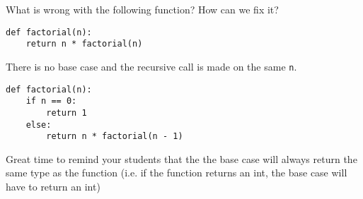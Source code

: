 \begin{blocksection}
\question What is wrong with the following function? How can we fix it?

\begin{lstlisting}
def factorial(n):
    return n * factorial(n)
\end{lstlisting}

\begin{solution}[1in]
There is no base case and the recursive call is made on the same \lstinline{n}.

\begin{lstlisting}
def factorial(n):
    if n == 0:
        return 1
    else:
        return n * factorial(n - 1)
\end{lstlisting}
\end{solution}

\begin{questionmeta}
    Great time to remind your students that the the base case will always return
     the same type as the function (i.e. if the function returns an int, the base case will have to return an int)
\end{questionmeta}
\end{blocksection}
